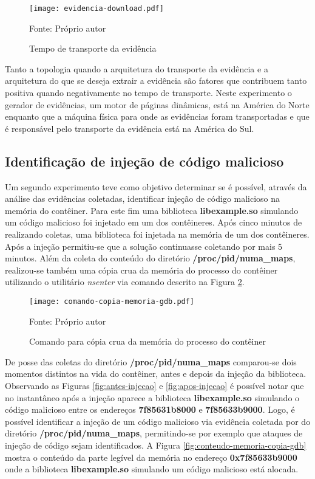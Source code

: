 \begin{figure}[htb!]
\footnotesize
\caption{Tempo de transporte da evidência}
\texttt{[image: evidencia-download.pdf]}
\centering
\label{fig:evidencia_transporte}
\begin{center}
Fonte: Próprio autor 
\end{center}
\end{figure}


%
Tanto a topologia quando a arquitetura do transporte da evidência e a arquitetura do que se deseja extrair a evidência são fatores que contribuem tanto positiva quando negativamente no tempo de transporte.
%
Neste experimento o gerador de evidências, um motor de páginas dinâmicas, está na América do Norte enquanto que a máquina física para onde as evidências foram transportadas e que é responsável pelo transporte da evidência está na América do Sul.


\subsection{Identificação de injeção de código malicioso}
\label{sec:proposta-exp-malware}

Um segundo experimento teve como objetivo determinar se é possível, através da análise das evidências coletadas, identificar injeção de código malicioso na memória do contêiner.
%
Para este fim uma biblioteca \textbf{libexample.so} simulando um código malicioso foi injetado em um dos contêineres.
%
Após cinco minutos de \fancyname realizando coletas, uma biblioteca foi injetada na memória de um dos contêineres. Após a injeção permitiu-se que a solução continuasse coletando por mais 5 minutos.
%
Além da coleta do conteúdo do diretório \textbf{/proc/pid/numa\_maps}, realizou-se também uma cópia crua da memória do processo do contêiner utilizando o utilitário \textit{nsenter} via comando descrito na Figura \ref{fig:comando-copia}.

\begin{figure}[htb!]
\footnotesize
\caption{Comando para cópia crua da memória do processo do contêiner}
\texttt{[image: comando-copia-memoria-gdb.pdf]}
\centering
\label{fig:comando-copia}
\begin{center}
Fonte: Próprio autor 
\end{center}
\end{figure}

%
De posse das coletas do diretório \textbf{/proc/pid/numa\_maps} comparou-se dois momentos distintos na vida do contêiner, antes e depois da injeção da biblioteca.
%
Observando as Figuras \ref{fig:antes-injecao} e \ref{fig:apos-injecao} é possível notar que no instantâneo após a injeção aparece a biblioteca \textbf{libexample.so} simulando o código malicioso entre os endereços \textbf{7f85631b8000} e \textbf{7f85633b9000}.
%
Logo, é possível identificar a injeção de um código malicioso via evidência coletada por \fancyname do diretório \textbf{/proc/pid/numa\_maps}, permitindo-se por exemplo que ataques de injeção de código sejam identificados.
%
A Figura \ref{fig:conteudo-memoria-copia-gdb} mostra o conteúdo da parte legível da memória no endereço \textbf{0x7f85633b9000} onde a biblioteca \textbf{libexample.so} simulando um código malicioso está alocada.

